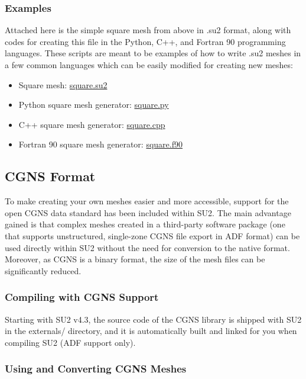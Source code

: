\documentclass{article}
\begin{document}
\subsubsection{Examples}

Attached here is the simple square mesh from above in .su2 format, along with codes for creating this file in the Python, C++, and Fortran 90 programming languages. These scripts are meant to be examples of how to write .su2 meshes in a few common languages which can be easily modified for creating new meshes:

\begin{itemize}
    \item Square mesh: \href{run:./square.su2}{square.su2}
    \item Python square mesh generator: \href{run:./square.py}{square.py}
    \item C++ square mesh generator: \href{run:./square.cpp}{square.cpp}
    \item Fortran 90 square mesh generator: \href{run:./square.f90}{square.f90}
    
\end{itemize}
   

\subsection{CGNS Format}

To make creating your own meshes easier and more accessible, support for the open CGNS data standard has been included within SU2. The main advantage gained is that complex meshes created in a third-party software package (one that supports unstructured, single-zone CGNS file export in ADF format) can be used directly within SU2 without the need for conversion to the native format. Moreover, as CGNS is a binary format, the size of the mesh files can be significantly reduced.

\subsubsection{Compiling with CGNS Support}

Starting with SU2 v4.3, the source code of the CGNS library is shipped with SU2 in the externals/ directory, and it is automatically built and linked for you when compiling SU2 (ADF support only).


\subsubsection{Using and Converting CGNS Meshes}
\end{document}
